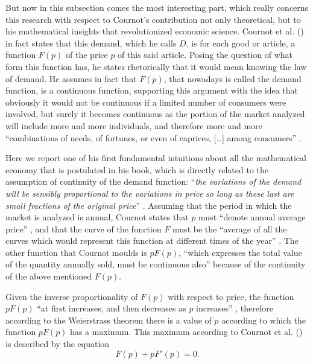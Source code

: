 \documentclass[12pt]{article}
\numberwithin{equation}{subsection}
\begin{document}
But now in this subsection comes the most interesting part, which really concerns this research with respect to Cournot's contribution not only theoretical, but to his mathematical insights that revolutionized economic science. Cournot et al. (\citeyear[p. 47]{cournot1897researches}) in fact states that this demand, which he calls $D$, is for each good or article, a function $F(p)$ of the price $p$ of this said article. Posing the question of what form this function has, he states rhetorically that it would mean knowing the law of demand. He assumes in fact that $F(p)$, that nowadays is called the demand function, is a continuous function, supporting this argument with the idea that obviously it would not be continuous if a limited number of consumers were involved, but surely it becomes continuous as the portion of the market analyzed will include more and more individuals, and therefore more and more ``combinations of needs, of fortunes, or even of caprices, [\ldots] among consumers'' \cite[p. 50]{cournot1897researches}.

Here we report one of his first fundamental intuitions about all the mathematical economy that is postulated in his book, which is directly related to the assumption of continuity of the demand function: ``\emph{the variations of the demand will be sensibly proportional to the variations in price so long as these last are small fractions of the original price}'' \cite[p. 50]{cournot1897researches}. Assuming that the period in which the market is analyzed is annual, Cournot states that $p$ must ``denote annual average price'' \cite[p. 52]{cournot1897researches}, and that the curve of the function $F$ must be the ``average of all the curves which would represent this function at different times of the year'' \cite[p. 52]{cournot1897researches}. The other function that Cournot moulds is $pF(p)$, ``which expresses the total value of the quantity annually sold, must be continuous also'' \cite[p. 52]{cournot1897researches} because of the continuity of the above mentioned $F(p)$.

Given the inverse proportionality of $F(p)$ with respect to price, the function $pF(p)$ ``at first increases, and then decreases as $p$ increases'' \cite[p. 53]{cournot1897researches}, therefore according to the Weierstrass theorem there is a value of $p$ according to which the function $pF(p)$ has a maximum. This maximum according to Cournot et al. (\citeyear[p. 53]{cournot1897researches}) is described by the equation \begin{equation}
\label{eq:Max_C}
F(p) + pF'(p) = 0.
\end{equation}
\end{document}
